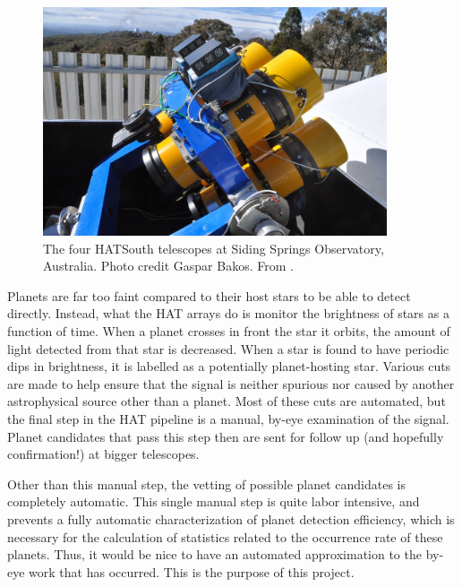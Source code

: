 \begin{figure}
\begin{centering}
\includegraphics[width=4in]{hs-scopes.png}
\caption{\label{hsscopes} The four HATSouth telescopes at Siding Springs Observatory, Australia.  Photo credit Gaspar Bakos.  From \cite{hatsouthpicture}.}
\end{centering}
\end{figure}

Planets are far too faint compared to their host stars to be able to detect directly.  Instead, what the HAT arrays do is monitor the brightness of stars as a function of time.  When a planet crosses in front the star it orbits, the amount of light detected from that star is decreased.  When a star is found to have periodic dips in brightness, it is labelled as a potentially planet-hosting star.  Various cuts are made to help ensure that the signal is neither spurious nor caused by another astrophysical source other than a planet.  Most of these cuts are automated, but the final step in the HAT pipeline is a manual, by-eye examination of the signal.  Planet candidates that pass this step then are sent for follow up (and hopefully confirmation!) at bigger telescopes.

Other than this manual step, the vetting of possible planet candidates is completely automatic.  This single manual step is quite labor intensive, and prevents a fully automatic characterization of planet detection efficiency, which is necessary for the calculation of statistics related to the occurrence rate of these planets.  Thus, it would be nice to have an automated approximation to the by-eye work that has occurred.  This is the purpose of this project.
